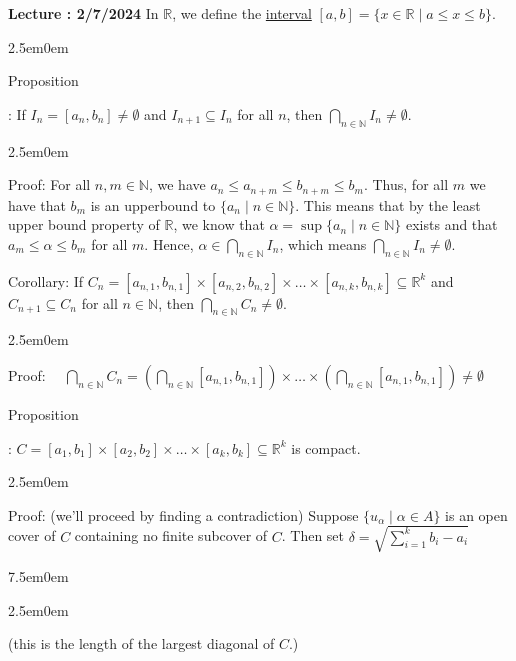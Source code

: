 \documentclass{book}
\newcommand{\hTwo}{%
   \color{MidnightBlue}%
   \fontsize{13}{15}\selectfont%
}
\newcommand{\hThree}{%
   \color{PineGreen}
   \fontsize{13}{15}\selectfont%
}
\newcommand{\hFour}{%
   \color{Cerulean}
   \fontsize{12}{14}\selectfont%
}
\newenvironment{myIndent}{%
   \begin{adjustwidth}{2.5em}{0em}%
}{%
   \end{adjustwidth}%
}
\newenvironment{myTindent}{%
   \begin{adjustwidth}{7.5em}{0em}%
}{%
   \end{adjustwidth}%
}
\newcommand{\udefine}[1]{%
   \setulcolor{Red}%
   \setul{0.14em}{0.07em}%
   \ul{#1}%
}
\newcommand{\retTwo}{\hfill\bigbreak}
\newcounter{LectureNumber}
\newcommand*{\markLecture}[1]{%
   \stepcounter{LectureNumber}%
   {\huge \color{Black} \textbf{Lecture \theLectureNumber: #1} \newline}%
}
\newcounter{PropNumber}
\newcommand{\propCount}[1][1]{%
   \addtocounter{PropNumber}{#1}%
   \thePropNumber%
}
\begin{document}
   \retTwo
   \markLecture{2/7/2024} \retTwo
   In $\mathbb{R}$, we define the \udefine{interval} $[a, b] = \{x \in \mathbb{R} \mid a \leq x \leq b\}$.

   {\begin{myIndent} \hTwo
      Proposition \propCount: If $I_n = [a_n, b_n] \neq \emptyset$ and $I_{n+1} \subseteq I_n$ for all $n$, then ${\displaystyle \bigcap_{n\in\mathbb{N}}{I_n} \neq \emptyset}$. \\

      {\begin{myIndent} \hThree
         Proof: For all $n, m \in \mathbb{N}$, we have $a_n \leq a_{n+m} \leq b_{n+m} \leq b_m$. Thus, for all $m$ we have that $b_m$ is an upperbound to $\{a_n \mid n\in\mathbb{N}\}$. This means that by the least upper bound property of $\mathbb{R}$, we know that $\alpha = \sup{\{a_n \mid n\in\mathbb{N}\}}$ exists and that $a_m \leq \alpha \leq b_m$ for all $m$. Hence, $\alpha \in {\displaystyle \bigcap_{n \in \mathbb{N}}{I_n}}$, which means ${\displaystyle \bigcap_{n \in \mathbb{N}}{I_n}} \neq \emptyset$.\retTwo
      \end{myIndent}}

      Corollary: If $C_n = [a_{n, 1}, b_{n, 1}] \times [a_{n, 2}, b_{n, 2}] \times \dots \times [a_{n, k}, b_{n, k}] \subseteq \mathbb{R}^k$ and $C_{n+1} \subseteq C_n$ for all $n \in \mathbb{N}$, then ${\displaystyle \bigcap_{n\in\mathbb{N}}{C_n} \neq \emptyset}$.

      {\begin{myIndent} \hThree
         Proof: $\quad {\displaystyle \bigcap_{n\in\mathbb{N}}{C_n} = \left(\bigcap_{n\in\mathbb{N}}{[a_{n, 1}, b_{n, 1}]}\right) \times \dots \times \left(\bigcap_{n\in\mathbb{N}}{[a_{n, 1}, b_{n, 1}]}\right) \neq \emptyset}$
         \retTwo \retTwo
      \end{myIndent}}

      \newpage

      Proposition \propCount: $C = [a_{1}, b_{1}] \times [a_{2}, b_{2}] \times \dots \times [a_{k}, b_{k}] \subseteq \mathbb{R}^k$ is compact.

      \begin{myIndent} \hThree
         Proof: (we'll proceed by finding a contradiction)
         Suppose $\{u_\alpha \mid \alpha \in A\}$ is an open cover of $C$ containing no finite subcover of $C$. \retTwo Then set $\delta = \sqrt{{\displaystyle \sum_{i=1}^k{b_i - a_i}}}$
         
         {\begin{myTindent}\begin{myIndent} \hFour
            (this is the length of the largest diagonal of $C$.) \retTwo
         \end{myIndent}\end{myTindent}}


\end{myIndent}
\end{myIndent}}
\end{document}
